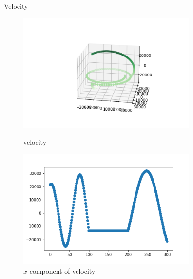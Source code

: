 \documentclass[12pt]{article}
\begin{document}
	Velocity
	\begin{figure}[H]
		\begin{multicols}{2}
			\includegraphics[width=\linewidth, height=6cm]{vs3.png} \caption{velocity} \label{vs3} \par
			\includegraphics[width=\linewidth, height=6cm]{vsx3.png} \caption{$x$-component of velocity} \label{vsx3} \par
		\end{multicols}
	\end{figure}
\end{document}

